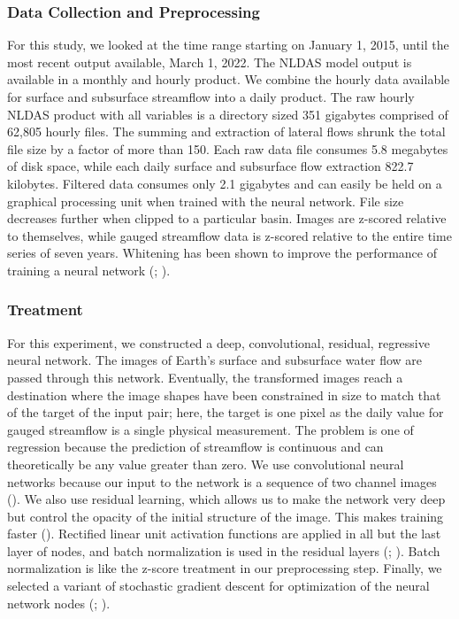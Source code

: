\begin{refsection}
\subsubsection{Data Collection and Preprocessing}
For this study, we looked at the time range starting on January 1, 2015, until the most recent output available, March 1, 2022. The NLDAS model output is available in a monthly and hourly product. We combine the hourly data available for surface and subsurface streamflow into a daily product. The raw hourly NLDAS product with all variables is a directory sized 351 gigabytes comprised of 62,805 hourly files. The summing and extraction of lateral flows shrunk the total file size by a factor of more than 150. Each raw data file consumes 5.8 megabytes of disk space, while each daily surface and subsurface flow extraction 822.7 kilobytes. Filtered data consumes only 2.1 gigabytes and can easily be held on a graphical processing unit when trained with the neural network. File size decreases further when clipped to a particular basin. Images are z-scored relative to themselves, while gauged streamflow data is z-scored relative to the entire time series of seven years. Whitening has been shown to improve the performance of training a neural network (\cite{karhunen1997class}; \cite{chen2020concept}).

\subsubsection{Treatment}
For this experiment, we constructed a deep, convolutional, residual, regressive neural network. The images of Earth’s surface and subsurface water flow are passed through this network. Eventually, the transformed images reach a destination where the image shapes have been constrained in size to match that of the target of the input pair; here, the target is one pixel as the daily value for gauged streamflow is a single physical measurement. The problem is one of regression because the prediction of streamflow is continuous and can theoretically be any value greater than zero. We use convolutional neural networks because our input to the network is a sequence of two channel images (\cite{rawat2017deep}). We also use residual learning, which allows us to make the network very deep but control the opacity of the initial structure of the image. This makes training faster (\cite{he2016deep}). Rectified linear unit activation functions are applied in all but the last layer of nodes, and batch normalization is used in the residual layers (\cite{agarap2018deep}; \cite{ioffe2015batch}). Batch normalization is like the z-score treatment in our preprocessing step. Finally, we selected a variant of stochastic gradient descent for optimization of the neural network nodes (\cite{amari1993backpropagation}; \cite{kingma2014adam}).


\end{refsection}
